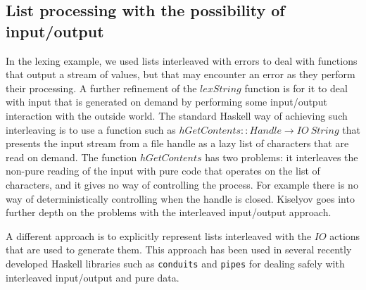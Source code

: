 \documentclass{jfp1}
\begin{document}
\subsection{List processing with the possibility of input/output}

In the lexing example, we used lists interleaved with errors to deal
with functions that output a stream of values, but that may encounter
an error as they perform their processing. A further refinement of the
$\mathit{lexString}$ function is for it to deal with input that is
generated on demand by performing some input/output interaction with
the outside world. The standard Haskell way of achieving such
interleaving is to use a function such as $\mathit{hGetContents} ::
\mathit{Handle} \to \mathit{IO}~\mathit{String}$ that presents the
input stream from a file handle as a lazy list of characters that are
read on demand. The function $\mathit{hGetContents}$ has two problems:
it interleaves the non-pure reading of the input with pure code that
operates on the list of characters, and it gives no way of controlling
the process. For example there is no way of deterministically
controlling when the handle is closed. Kiselyov
\cite{kiselyov12iteratees} goes into further depth on the problems
with the interleaved input/output approach.

A different approach is to explicitly represent lists interleaved with
the $\mathit{IO}$ actions that are used to generate them. This
approach has been used in several recently developed Haskell libraries
such as \texttt{conduits} and \texttt{pipes} for dealing safely with
interleaved input/output and pure data.
\end{document}
